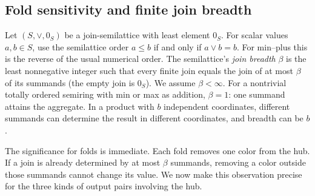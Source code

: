 \subsection{Fold sensitivity and finite join breadth}\label{sec:breadth}
Let $(S,\vee,0_S)$ be a join-semilattice with least element $0_S$.
For scalar values $a,b\in S$, use the semilattice order
$a\le b$ if and only if $a\vee b=b$. For min--plus this is the reverse
of the usual numerical order. The semilattice's \emph{join breadth} $\beta$ is the least nonnegative integer such
that every finite join equals the join of at most $\beta$ of its
summands (the empty join is $0_S$). We assume $\beta<\infty$.
For a nontrivial totally ordered semiring with min or max as addition,
$\beta=1$: one summand attains the aggregate. In a product with
$b$ independent coordinates, different summands can determine
the result in different coordinates, and breadth can be $b$.

The significance for folds is immediate. Each fold removes one
color from the hub. If a join is already determined by at most
$\beta$ summands, removing a color outside those summands
cannot change its value. We now make this observation precise
for the three kinds of output pairs involving the hub.

